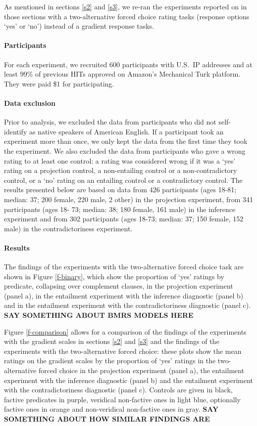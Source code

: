 \documentclass[11pt,fleqn]{article}
\newcommand{\6}{\mbox{$[\hspace*{-.6mm}[$}}
\newcommand{\9}{\mbox{$]\hspace*{-.6mm}]$}}
\begin{document}
{As mentioned in sections \ref{s2} and \ref{s3}, we re-ran the experiments reported on in those sections with a two-alternative forced choice rating tasks (response options `yes' or `no') instead of a gradient response tasks. 

\paragraph{Participants} For each experiment, we recruited 600 participants with U.S.\ IP addresses and at least 99\% of previous HITs approved on Amazon's Mechanical Turk platform. They were paid \$1 for participating. 

\paragraph{Data exclusion} Prior to analysis, we excluded the data from participants who did not self-identify as native speakers of American English. If a participant took an experiment more than once, we only kept the data from the first time they took the experiment. We also excluded the data from participants who gave a wrong rating to at least one control: a rating was considered wrong if it was a `yes' rating on a projection control, a non-entailing control or a non-contradictory control, or a `no' rating on an entailing control or a contradictory control. The results presented below are based on data from 426 participants (ages 18-81; median: 37; 200 female, 220 male, 2 other) in the projection experiment, from 341 participants (ages 18- 73; median: 38; 180 female, 161 male) in the inference experiment and from 302 participants (ages 18-73; median: 37; 150 female, 152 male) in the contradictoriness experiment.

\paragraph{Results}

The findings of the experiments with the two-alternative forced choice task are shown in Figure \ref{f-binary}, which show the proportion of `yes' ratings by predicate, collapsing over complement clauses, in the projection experiment (panel a), in the entailment experiment with the inference diagnostic (panel b) and in the entailment experiment with the contradictoriness diagnostic (panel c). {\bf SAY SOMETHING ABOUT BMRS MODELS HERE}


Figure \ref{f-comparison} allows for a comparison of the findings of the experiments with the gradient scales in sections \ref{s2} and \ref{s3} and the findings of the experiments with the two-alternative forced choice: these plots show the mean ratings on the gradient scales by the proportion of `yes' ratings in the two-alternative forced choice in the projection experiment (panel a), the entailment experiment with the inference diagnostic (panel b) and the entailment experiment with the contradictoriness diagnostic (panel c). Controls are given in black, factive predicates in purple, veridical non-factive ones in light blue, optionally factive ones in orange and non-veridical non-factive ones in gray. {\bf SAY SOMETHING ABOUT HOW SIMILAR FINDINGS ARE}
    
}
\end{document}
